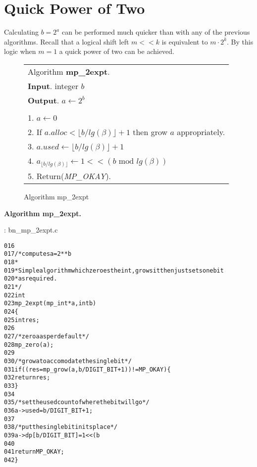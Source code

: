 \documentclass[b5paper]{book}
\begin{document}
\section{Quick Power of Two}
Calculating $b = 2^a$ can be performed much quicker than with any of the previous algorithms.  Recall that a logical shift left $m << k$ is
equivalent to $m \cdot 2^k$.  By this logic when $m = 1$ a quick power of two can be achieved.

\begin{figure}[!here]
\begin{small}
\begin{center}
\begin{tabular}{l}
\hline Algorithm \textbf{mp\_2expt}. \\
\textbf{Input}.   integer $b$ \\
\textbf{Output}.  $a \leftarrow 2^b$ \\
\hline \\
1.  $a \leftarrow 0$ \\
2.  If $a.alloc < \lfloor b / lg(\beta) \rfloor + 1$ then grow $a$ appropriately. \\
3.  $a.used \leftarrow \lfloor b / lg(\beta) \rfloor + 1$ \\
4.  $a_{\lfloor b / lg(\beta) \rfloor} \leftarrow 1 << (b \mbox{ mod } lg(\beta))$ \\
5.  Return(\textit{MP\_OKAY}). \\
\hline
\end{tabular}
\end{center}
\end{small}
\caption{Algorithm mp\_2expt}
\end{figure}

\textbf{Algorithm mp\_2expt.}

\vspace{+3mm}\begin{small}
\hspace{-5.1mm}{\bf File}: bn\_mp\_2expt.c
\vspace{-3mm}
\begin{alltt}
016   
017   /* computes a = 2**b 
018    *
019    * Simple algorithm which zeroes the int, grows it then just sets one bit
020    * as required.
021    */
022   int
023   mp_2expt (mp_int * a, int b)
024   \{
025     int     res;
026   
027     /* zero a as per default */
028     mp_zero (a);
029   
030     /* grow a to accomodate the single bit */
031     if ((res = mp_grow (a, b / DIGIT_BIT + 1)) != MP_OKAY) \{
032       return res;
033     \}
034   
035     /* set the used count of where the bit will go */
036     a->used = b / DIGIT_BIT + 1;
037   
038     /* put the single bit in its place */
039     a->dp[b / DIGIT_BIT] = 1 << (b % DIGIT_BIT);
040   
041     return MP_OKAY;
042   \}
\end{alltt}
\end{small}
\end{document}
